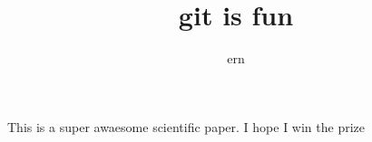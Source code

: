\documentclass[10pt]{article}
\author{ern}
\title{git is fun}
\begin{document}
	\maketitle
	
	This is a super awaesome scientific paper.
	I hope I win the prize
	
\end{document}
